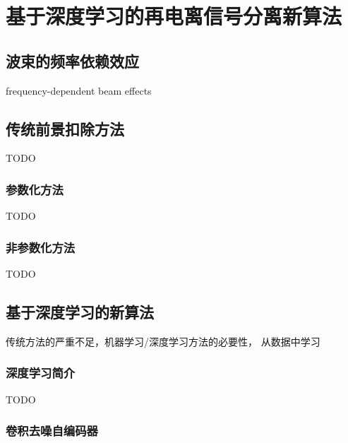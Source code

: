 \chapter{基于深度学习的再电离信号分离新算法}
\label{chap:cdae}

\section{波束的频率依赖效应}

frequency-dependent beam effects


\section{传统前景扣除方法}

TODO

\subsection{参数化方法}

TODO

\subsection{非参数化方法}

TODO


\section{基于深度学习的新算法}

传统方法的严重不足，机器学习/深度学习方法的必要性，
从数据中学习

\subsection{深度学习简介}

TODO

\subsection{卷积去噪自编码器}

